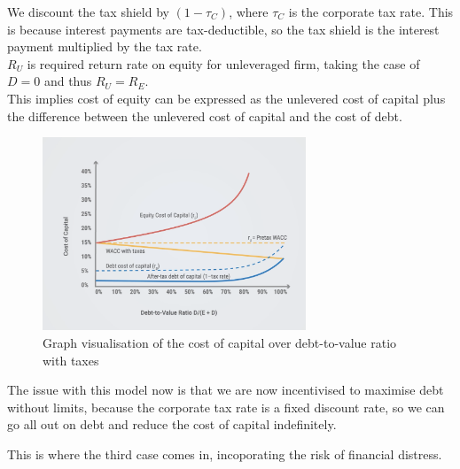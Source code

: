 We discount the tax shield by $(1-\tau_C)$, where $\tau_C$ is the corporate tax rate. This is because interest payments are tax-deductible, so the tax shield is the interest payment multiplied by the tax rate.\\

$R_U$ is required return rate on equity for unleveraged firm, taking the case of $D=0$ and thus $R_U = R_E$.\\

This implies cost of equity can be expressed as the unlevered cost of capital plus the difference between the unlevered cost of capital and the cost of debt.

\begin{figure}[H]
    \centering
    \includegraphics[width=0.7\textwidth]{img/8.3.png}
    \caption{Graph visualisation of the cost of capital over debt-to-value ratio with taxes}
\end{figure}

The issue with this model now is that we are now incentivised to maximise debt without limits, because the corporate tax rate is a fixed discount rate, so we can go all out on debt and reduce the cost of capital indefinitely.

This is where the third case comes in, incoporating the risk of financial distress. 

